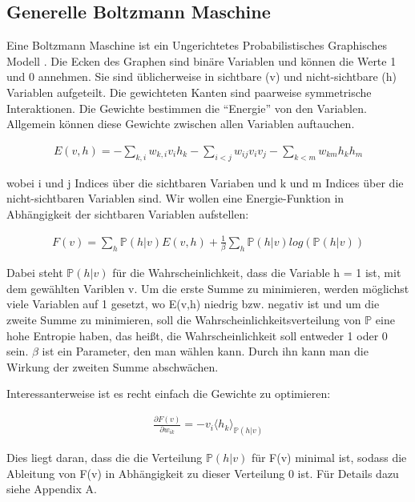 \subsection{Generelle Boltzmann Maschine}
\label{subsec:bm}

Eine Boltzmann Maschine ist ein Ungerichtetes Probabilistisches Graphisches Modell \citep{DBLP:journals/jmlr/SallansH04}. Die Ecken des Graphen sind binäre Variablen und können die Werte 1 und 0 annehmen. Sie sind üblicherweise in sichtbare (v) und nicht-sichtbare (h) Variablen aufgeteilt. Die gewichteten Kanten sind paarweise symmetrische Interaktionen. Die Gewichte bestimmen die ``Energie'' von den Variablen. Allgemein können diese Gewichte zwischen allen Variablen auftauchen.

\begin{align}
	E(v,h) = - \sum_{k,i}w_{k,i}v_ih_k - \sum_{i < j}w_{ij}v_iv_j - \sum_{k<m}w_{km}h_kh_m \label{energie}
\end{align}

wobei i und j Indices über die sichtbaren Variaben und k und m Indices über die nicht-sichtbaren Variablen sind.
Wir wollen eine Energie-Funktion in Abhängigkeit der sichtbaren Variablen aufstellen:

\begin{align}
	F(v) = \sum_{h}\mathbb{P}(h|v)E(v,h) + \frac{1}{\beta} \sum_{h}\mathbb{P}(h|v)log(\mathbb{P}(h|v)) \label{F}
\end{align}

Dabei steht $\mathbb{P}(h|v)$ für die Wahrscheinlichkeit, dass die Variable h = 1 ist, mit dem gewählten Variblen v.
Um die erste Summe zu minimieren, werden möglichst viele Variablen auf 1 gesetzt, wo E(v,h) niedrig bzw. negativ ist und um die zweite Summe zu minimieren, soll die Wahrscheinlichkeitsverteilung von $\mathbb{P}$ eine hohe Entropie haben, das heißt, die Wahrscheinlichkeit soll entweder 1 oder 0 sein.
$\beta$ ist ein Parameter, den man wählen kann. Durch ihn kann man die Wirkung der zweiten Summe abschwächen.

Interessanterweise ist es recht einfach die Gewichte zu optimieren:

\begin{align}
	\frac{\partial F(v)}{\partial w_{ik}} = -v_i \langle h_k \rangle_{\mathbb{P}(h|v)} \label{update}
\end{align}

Dies liegt daran, dass die die Verteilung $\mathbb{P}(h|v)$ für F(v) minimal ist, sodass die Ableitung von F(v) in Abhängigkeit zu dieser Verteilung 0 ist. Für Details dazu siehe \citep{DBLP:journals/jmlr/SallansH04} Appendix A.

